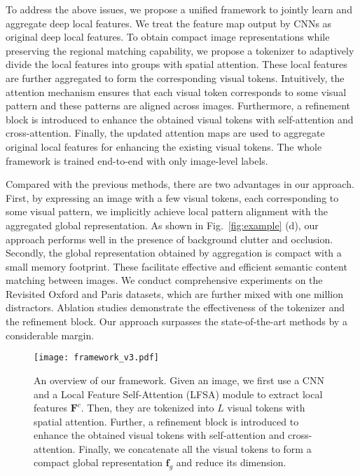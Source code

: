 \documentclass[letterpaper]{article} \usepackage{aaai22}  \usepackage{times}  \usepackage{helvet}  \usepackage{courier}  \usepackage[hyphens]{url}  \usepackage{graphicx} \urlstyle{rm} \def\UrlFont{\rm}  \usepackage{natbib}  \usepackage{caption} \DeclareCaptionStyle{ruled}{labelfont=normalfont,labelsep=colon,strut=off} \frenchspacing  \setlength{\pdfpagewidth}{8.5in}  \setlength{\pdfpageheight}{11in}  \usepackage{algorithm}
\begin{document}
To address the above issues, we propose a unified framework to jointly learn and aggregate deep local features. 
We treat the feature map output by CNNs as original deep local features.
To obtain compact image representations while preserving the regional matching capability, we propose a tokenizer to adaptively divide the local features into groups with spatial attention. These local features are further aggregated to form the corresponding visual tokens. Intuitively, the attention mechanism ensures that each visual token corresponds to some visual pattern and these patterns are aligned across images. Furthermore, a refinement block is introduced to enhance the obtained visual tokens with self-attention and cross-attention. Finally, the updated attention maps are used to aggregate original local features for enhancing the existing visual tokens. The whole framework is trained end-to-end with only image-level labels.

Compared with the previous methods, there are two advantages in our approach. 
First, by expressing an image with a few visual tokens, each corresponding to some visual pattern, we implicitly achieve local pattern alignment with the aggregated global representation. As shown in Fig.~\ref{fig:example} (d), our approach performs well in the presence of background clutter and occlusion. 
Secondly, the global representation obtained by aggregation is compact with a small memory footprint.  
These facilitate effective and efficient semantic content matching between images. 
We conduct comprehensive experiments on the Revisited Oxford and Paris datasets, which are further mixed with one million distractors.
Ablation studies demonstrate the effectiveness of the tokenizer and the refinement block.
Our approach surpasses the state-of-the-art methods by a considerable margin. 

\begin{figure*}[t]
	\begin{center}
		\texttt{[image: framework\_v3.pdf]}
	\end{center}
	\caption{An overview of our framework. 
		Given an image, we first use a CNN and a Local Feature Self-Attention (LFSA) module to extract local features $\bm{F}^c$. Then, they are tokenized into $L$ visual tokens with spatial attention. 
		Further, a refinement block is introduced to enhance the obtained visual tokens with self-attention and cross-attention.
		Finally, we concatenate all the visual tokens to form a compact global representation $\bm{f}_g$ and reduce its dimension.}
	\label{fig:framwork}
\end{figure*}
\end{document}
